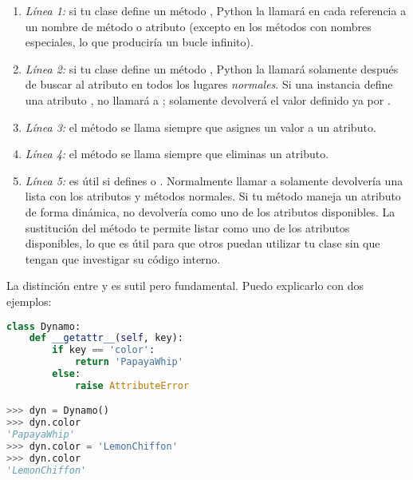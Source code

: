 \begin{enumerate}
  \item \emph{Línea 1:} si tu clase define un método , Python la llamará en cada referencia a un nombre de método o atributo (excepto en los métodos con nombres especiales, lo que produciría un bucle infinito).
  \item \emph{Línea 2:} si tu clase define un método , Python la llamará solamente después de buscar al atributo en todos los lugares \emph{normales}. Si una instancia  define una atributo ,  no llamará a ; solamente devolverá el valor definido ya por .
  \item \emph{Línea 3:} el método  se llama siempre que asignes un valor a un atributo.
  \item \emph{Línea 4:} el método  se llama siempre que eliminas un atributo.
  \item \emph{Línea 5:}  es útil si defines  o . Normalmente llamar a  solamente devolvería una lista con los atributos y métodos normales. Si tu método  maneja un atributo  de forma dinámica,  no devolvería  como uno de los atributos disponibles. La sustitución del método  te permite listar  como uno de los atributos disponibles, lo que es útil para que otros puedan utilizar tu clase sin que tengan que investigar su código interno.
\end{enumerate}

La distinción entre  y  es sutil pero fundamental. Puedo explicarlo con dos ejemplos:


\begin{lstlisting}[language=Python,breaklines=true,mathescape=false]
class Dynamo:
    def __getattr__(self, key):
        if key == 'color':         
            return 'PapayaWhip'
        else:
            raise AttributeError   

>>> dyn = Dynamo()
>>> dyn.color                      
'PapayaWhip'
>>> dyn.color = 'LemonChiffon'
>>> dyn.color                      
'LemonChiffon'
\end{lstlisting}


